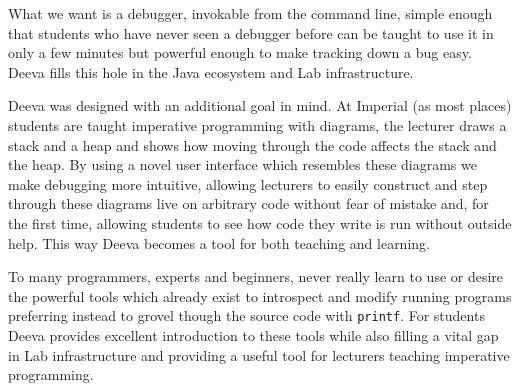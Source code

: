 \documentclass[11pt, a4paper]{article}
\newcommand{\cmd}[1]{{\tt #1}}
\begin{document}
What we want is a debugger, invokable from the command line, simple enough that students who have never seen a debugger before can be taught to use it in only a few minutes but powerful enough to make tracking down a bug easy.
Deeva fills this hole in the Java ecosystem and Lab infrastructure.

Deeva was designed with an additional goal in mind.
At Imperial (as most places) students are taught imperative programming with diagrams, the lecturer draws a stack and a heap and shows how moving through the code affects the stack and the heap.
By using a novel user interface which resembles these diagrams we make debugging more intuitive, allowing lecturers to easily construct and step through these diagrams live on arbitrary code without fear of mistake and, for the first time, allowing students to see how code they write is run without outside help.
This way Deeva becomes a tool for both teaching and learning.

To many programmers, experts and beginners, never really learn to use or desire the powerful tools which already exist to introspect and modify running programs preferring instead to grovel though the source code with \cmd{printf}.
For students Deeva provides excellent introduction to these tools while also filling a vital gap in Lab infrastructure and providing a useful tool for lecturers teaching imperative programming.


%

\end{document}
